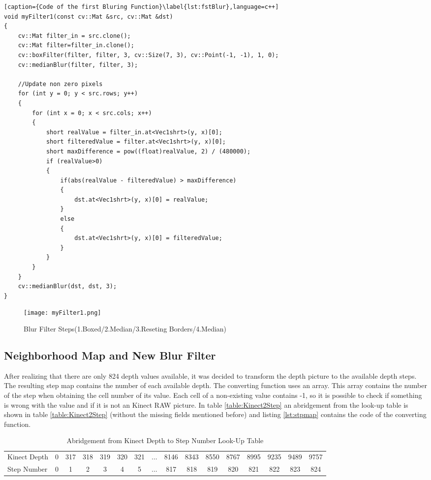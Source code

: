 \begin{lstlisting}[caption={Code of the first Bluring Function}\label{lst:fstBlur},language=c++]
void myFilter1(const cv::Mat &src, cv::Mat &dst)
{
	cv::Mat filter_in = src.clone();
	cv::Mat filter=filter_in.clone();
	cv::boxFilter(filter, filter, 3, cv::Size(7, 3), cv::Point(-1, -1), 1, 0);
	cv::medianBlur(filter, filter, 3);
	
	//Update non zero pixels
	for (int y = 0; y < src.rows; y++)
	{
		for (int x = 0; x < src.cols; x++)
		{
			short realValue = filter_in.at<Vec1shrt>(y, x)[0];
			short filteredValue = filter.at<Vec1shrt>(y, x)[0];
			short maxDifference = pow((float)realValue, 2) / (480000);
			if (realValue>0)
			{
				if(abs(realValue - filteredValue) > maxDifference)
				{
					dst.at<Vec1shrt>(y, x)[0] = realValue;
				}
				else
				{
					dst.at<Vec1shrt>(y, x)[0] = filteredValue;
				}
			}
		}
	}
	cv::medianBlur(dst, dst, 3);
}
\end{lstlisting}

\begin{figure}[H]
\begin{center}
  \texttt{[image: myFilter1.png]}
  \caption[Blur Filter Steps]{Blur Filter Steps(1.Boxed/2.Median/3.Reseting Borders/4.Median)}
  \label{figure:blur}
\end{center}
\end{figure}

\subsection{Neighborhood Map and New Blur Filter} \label{sect:blurFilter} 
After realizing that there are only 824 depth values available, it was decided to transform the depth picture
to the available depth steps. The resulting step map contains the number of each available depth. 
The converting function uses an array. This array contains the number of the
step when obtaining the cell number of its value. Each cell of a non-existing value contains -1, so it is
possible to check if something is wrong with the value and if it is not an Kinect RAW picture.
In table \vref{table:Kinect2Step} an abridgement from the look-up table is shown in table \vref{table:Kinect2Step}
(without the missing fields mentioned before) and listing \vref{lst:stpmap} contains the code of the converting function.


\begin{table}[H]
\centering
\tiny
\begin{tabular}{lccccccccccccccc}
Kinect Depth& 0 & 317 & 318 & 319 & 320 & 321 & ... & 8146 & 8343 & 8550 & 8767 & 8995 & 9235 & 9489 & 9757\\
Step Number & 0 &   1 &   2 &   3 &   4 &   5 & ... &   817 & 818 &  819 &  820 &  821 &  822 & 823  & 824\\
\end{tabular}
\caption{Abridgement from Kinect Depth to Step Number Look-Up Table }
\label{table:Kinect2Step}
\end{table}


